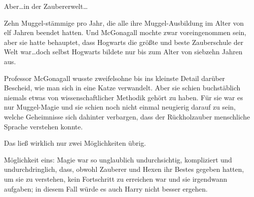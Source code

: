 Aber…in der Zaubererwelt…

Zehn Muggel-stämmige pro Jahr, die alle ihre Muggel-Ausbildung im Alter von elf Jahren beendet hatten. Und McGonagall mochte zwar voreingenommen sein, aber sie hatte behauptet, dass Hogwarts die größte und beste Zauberschule der Welt war…doch selbst Hogwarts bildete nur bis zum Alter von siebzehn Jahren aus.

Professor McGonagall wusste zweifelsohne bis ins kleinste Detail darüber Bescheid, wie man sich in eine Katze verwandelt. Aber sie schien buchstäblich niemals etwas von wissenschaftlicher Methodik gehört zu haben. Für sie war es nur Muggel-Magie und sie schien noch nicht einmal neugierig darauf zu sein, welche Geheimnisse sich dahinter verbargen, dass der Rückholzauber menschliche Sprache verstehen konnte.

Das ließ wirklich nur zwei Möglichkeiten übrig.

Möglichkeit eins: Magie war so unglaublich undurchsichtig, kompliziert und undurchdringlich, dass, obwohl Zauberer und Hexen ihr Bestes gegeben hatten, um sie zu verstehen, kein Fortschritt zu erreichen war und sie irgendwann aufgaben; in diesem Fall würde es auch Harry nicht besser ergehen.

